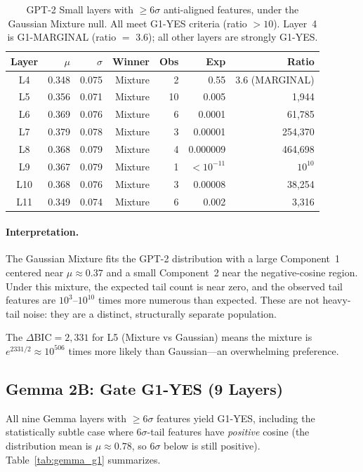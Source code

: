 \documentclass[11pt,a4paper]{article}
\begin{document}
\begin{table}[H]
\centering
\caption{GPT-2 Small layers with $\geq 6\sigma$ anti-aligned features, under the Gaussian Mixture null. All meet G1-YES criteria (ratio $> 10$). Layer~4 is G1-MARGINAL (ratio $=$ 3.6); all other layers are strongly G1-YES.}
\label{tab:gpt2_g1}
\small
\begin{tabular}{@{}crrrrrr@{}}
\toprule
Layer & $\mu$ & $\sigma$ & Winner & Obs & Exp & Ratio \\
\midrule
L4  & 0.348 & 0.075 & Mixture & 2  & 0.55 & 3.6 (MARGINAL) \\
L5  & 0.356 & 0.071 & Mixture & 10 & 0.005 & 1,944 \\
L6  & 0.369 & 0.076 & Mixture & 6  & 0.0001 & 61,785 \\
L7  & 0.379 & 0.078 & Mixture & 3  & 0.00001 & 254,370 \\
L8  & 0.368 & 0.079 & Mixture & 4  & 0.000009 & 464,698 \\
L9  & 0.367 & 0.079 & Mixture & 1  & $< 10^{-11}$ & $10^{10}$ \\
L10 & 0.368 & 0.076 & Mixture & 3  & 0.00008 & 38,254 \\
L11 & 0.349 & 0.074 & Mixture & 6  & 0.002 & 3,316 \\
\bottomrule
\end{tabular}
\end{table}

\paragraph{Interpretation.} The Gaussian Mixture fits the GPT-2 distribution with a large Component~1 centered near $\mu \approx 0.37$ and a small Component~2 near the negative-cosine region. Under this mixture, the expected tail count is near zero, and the observed tail features are $10^3$--$10^{10}$ times more numerous than expected. These are not heavy-tail noise: they are a distinct, structurally separate population.

The $\Delta\text{BIC} = 2{,}331$ for L5 (Mixture vs Gaussian) means the mixture is $e^{2331/2} \approx 10^{506}$ times more likely than Gaussian---an overwhelming preference.

\subsection{Gemma 2B: Gate G1-YES (9 Layers)}
\label{sec:gemma}

All nine Gemma layers with $\geq 6\sigma$ features yield G1-YES, including the statistically subtle case where 6$\sigma$-tail features have \emph{positive} cosine (the distribution mean is $\mu \approx 0.78$, so 6$\sigma$ below is still positive). Table~\ref{tab:gemma_g1} summarizes.
\end{document}
